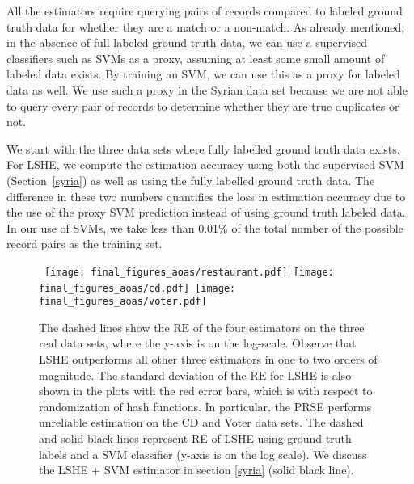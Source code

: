\documentclass{imsart}
\begin{document}
All the estimators require querying pairs of records compared to labeled ground truth data for whether they are a match or a non-match. As already mentioned, in the absence of full labeled ground truth data, we can use a supervised classifiers such as SVMs as a proxy, assuming at least some small amount of labeled data exists. By training an SVM, we can use this as a proxy for labeled data as well. We use such a proxy in the Syrian data set because we are not able to query every pair of records to determine whether they are true duplicates or not.



We start with the three data sets where fully labelled ground truth data exists. For LSHE, we compute the estimation accuracy using both the supervised SVM (Section~\ref{syria}) as well as using the fully labelled ground truth data. The difference in these two numbers quantifies the loss in estimation accuracy due to the use of the proxy SVM prediction instead of using ground truth labeled data. In our use of SVMs, we take less than 0.01$\%$ of the total number of the possible record pairs as the training set.

\begin{figure}[H]
	\mbox{
		\hspace{-0.1in}
		\texttt{[image: final\_figures\_aoas/restaurant.pdf]}\hspace{-0.18in}
		\texttt{[image: final\_figures\_aoas/cd.pdf]}\hspace{-0.16in}
		\texttt{[image: final\_figures\_aoas/voter.pdf]}}
	\caption{ The dashed lines show the $\text{RE}$ of the four estimators on the three real data sets, where the y-axis is on the log-scale. Observe that LSHE outperforms all other three estimators in one to two orders of magnitude. The standard deviation of the $\text{RE}$ for LSHE is also shown in the plots with the red error bars, which is with respect to randomization of hash functions.  In particular, the PRSE performs unreliable estimation on the CD and Voter data sets. The dashed and solid black lines represent RE of LSHE using ground truth labels and a SVM classifier (y-axis is on the log scale). We discuss the LSHE + SVM estimator in section \ref{syria} (solid black line).}
	\label{fg1}
\end{figure}
\end{document}
